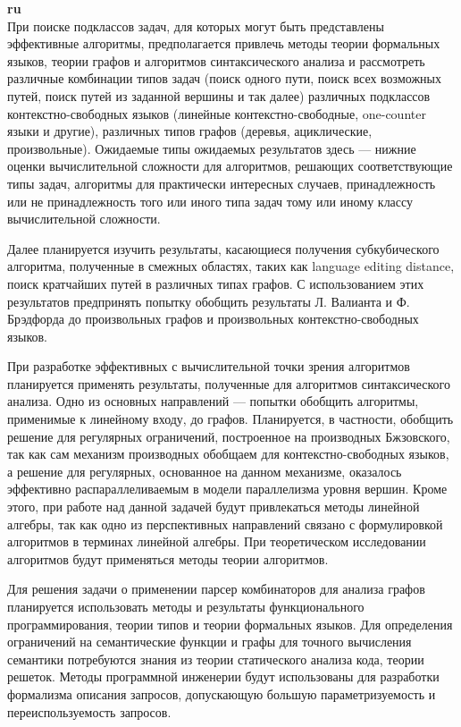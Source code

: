 \documentclass[12pt]{article}  %
\theoremstyle{remark}
\begin{document}
\textbf{ru}\\
При поиске подклассов задач, для которых могут быть представлены эффективные алгоритмы, предполагается привлечь методы теории формальных языков, теории графов и алгоритмов синтаксического анализа и рассмотреть различные комбинации типов задач (поиск одного пути, поиск всех возможных путей, поиск путей из заданной вершины и так далее) различных подклассов контекстно-свободных языков (линейные контекстно-свободные, one-counter языки и другие), различных типов графов (деревья, ациклические, произвольные).
Ожидаемые типы ожидаемых результатов здесь --- нижние оценки вычислительной сложности для алгоритмов, решающих соответствующие типы задач, алгоритмы для практически интересных случаев, принадлежность или не принадлежность того или иного типа задач тому или иному классу вычислительной сложности.

Далее планируется изучить результаты, касающиеся получения субкубического алгоритма, полученные в смежных областях, таких как language editing distance, поиск кратчайших путей в различных типах графов. С использованием этих результатов предпринять попытку обобщить результаты Л. Валианта и Ф. Брэдфорда до произвольных графов и произвольных контекстно-свободных языков.

При разработке эффективных с вычислительной точки зрения алгоритмов планируется применять результаты, полученные для алгоритмов синтаксического анализа. Одно из основных направлений --- попытки обобщить алгоритмы, применимые к линейному входу, до графов. Планируется, в частности, обобщить решение для регулярных ограничений, построенное на производных Бжзовского, так как сам механизм производных обобщаем для контекстно-свободных языков, а решение для регулярных, основанное на данном механизме, оказалось эффективно распараллеливаемым в модели параллелизма уровня вершин. Кроме этого, при работе над данной задачей будут привлекаться методы линейной алгебры, так как одно из перспективных направлений связано с формулировкой алгоритмов в терминах линейной алгебры. При теоретическом исследовании алгоритмов будут применяться методы теории алгоритмов.

Для решения задачи о применении парсер комбинаторов для анализа графов планируется использовать методы и результаты функционального программирования, теории типов и теории формальных языков.
Для определения ограничений на семантические функции и графы для точного вычисления семантики потребуются знания из теории статического анализа кода, теории решеток.
Методы программной инженерии будут использованы для разработки формализма описания запросов, допускающую большую параметризуемость и переиспользуемость запросов.
\end{document}
